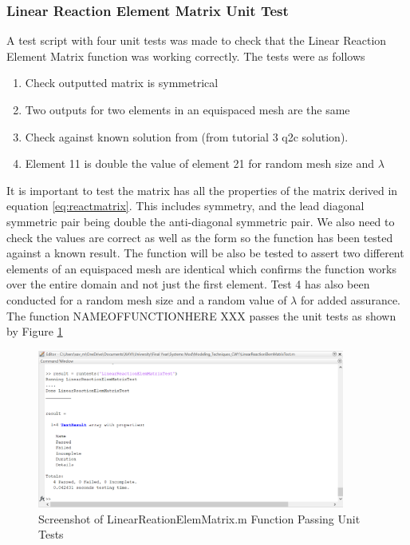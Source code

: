 \documentclass[11pt]{article}
\begin{document}
\subsubsection{Linear Reaction Element Matrix Unit Test}

A test script with four unit tests was made to check that the Linear Reaction Element Matrix function was working correctly. The tests were as follows\\
\begin{enumerate}
\item{Check outputted matrix is symmetrical}
\item{Two outputs for two elements in an equispaced mesh are the same }
\item{Check against known solution from (from tutorial 3 q2c solution).}
\item{Element 11 is double the value of element 21 for random mesh size and $\lambda$}
\end{enumerate}

It is important to test the matrix has all the properties of the matrix derived in equation \ref{eq:reactmatrix}. This includes symmetry, and the lead diagonal symmetric pair being double the anti-diagonal symmetric pair. We also need to check the values are correct as well as the form so the function has been tested against a known result. The function will be also be tested to assert two different elements of an equispaced mesh are identical which confirms the function works over the entire domain and not just the first element. Test 4 has also been conducted for a random mesh size and a random value of $\lambda$ for added assurance. \\
The function NAMEOFFUNCTIONHERE XXX passes the unit tests as shown by Figure \ref{fig:passTest2}

\begin{figure}[h!]
	\centering
	\includegraphics[width=0.9\textwidth]{LRtest2.PNG}
	\caption{Screenshot of LinearReationElemMatrix.m Function Passing Unit Tests}\label{fig:passTest2}
\end{figure}
\end{document}

